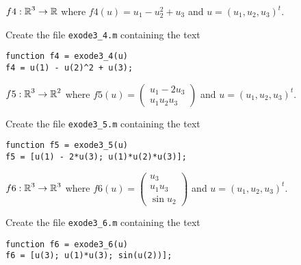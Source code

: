 \documentclass{ximera}
\begin{document}
\begin{exercise} \label{c11.3.2d}
$f4:\mbox{$\Bbb{R}$}^3\to\mbox{$\Bbb{R}$}$ where $f4(u)=u_1-u_2^2 + u_3$ and $u=(u_1,u_2,u_3)^t$.

\begin{solution}

Create the file {\tt exode3\_4.m} containing the text
\begin{verbatim}
function f4 = exode3_4(u)
f4 = u(1) - u(2)^2 + u(3);
\end{verbatim}

\end{solution}
\end{exercise}
\begin{exercise} \label{c11.3.2e}
$f5:\mbox{$\Bbb{R}$}^3\to\mbox{$\Bbb{R}$}^2$ where $f5(u)=\left(\begin{array}{c} u_1 -2u_3\\u_1 u_2 u_3\end{array}\right)$ and $u=(u_1,u_2,u_3)^t$.

\begin{solution}

Create the file {\tt exode3\_5.m} containing the text
\begin{verbatim}
function f5 = exode3_5(u)
f5 = [u(1) - 2*u(3); u(1)*u(2)*u(3)];
\end{verbatim}

\end{solution}
\end{exercise}
\begin{exercise} \label{c11.3.2f}
$f6:\mbox{$\Bbb{R}$}^3\to\mbox{$\Bbb{R}$}^3$ where $f6(u)=\left(\begin{array}{c} u_3\\u_1 u_3\\ 
\sin u_2\end{array}\right)$ and $u=(u_1,u_2,u_3)^t$.

\begin{solution}

Create the file {\tt exode3\_6.m} containing the text
\begin{verbatim}
function f6 = exode3_6(u)
f6 = [u(3); u(1)*u(3); sin(u(2))];
\end{verbatim}


\end{solution}
\end{exercise}
\end{document}
